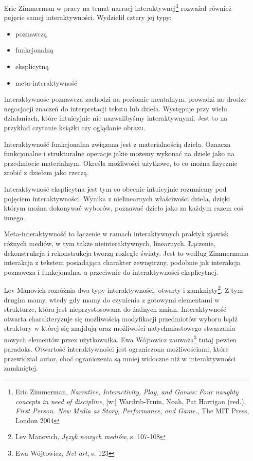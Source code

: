 \documentclass[a4paper,12pt,twoside]{article}
\begin{document}
Eric Zimmerman w pracy na temat narracj interaktywnej\footnote{Eric Zimmerman,
\textit{Narrative, Interactivity, Play, and Games: Four naughty concepts
in need of discipline}, [w:] Wardrib-Fruin, Noah, Pat Harrigan (red.),
\textit{First Person. New Media as Story, Performance, and Game.},
The MIT Press, London 2004} rozważał również
pojęcie samej interaktywności. Wydzielił cztery jej typy:
\begin{itemize}
\item poznawczą
\item funkcjonalną
\item eksplicytną
\item meta-interaktywność
\end{itemize}
Interaktywnośc poznawcza zachodzi na poziomie mentalnym, prowadzi na drodze
negocjacji znaczeń do interpretacji tekstu lub dzieła. Występuje przy
wielu działaniach, które intuicyjnie nie nazwalibyśmy interaktywnymi.
Jest to na przykład czytanie książki czy oglądanie obrazu.

Interaktywność funkcjonalna związana jest z materialnością dzieła.
Oznacza funkcjonalne i strukturalne operacje jakie możemy wykonać
na dziele jako na przedmiocie materialnym. Określa możliwości użytkowe,
to co można fizycznie zrobić z dziełem jako rzeczą.

Interaktywność eksplicytna jest tym co obecnie intuicyjnie rozumiemy
pod pojęciem interaktywności. Wynika z nielinearnych właściwości dzieła,
dzięki którym można dokonywać wyborów, poznawać dzieło jako za każdym
razem coś innego.

Meta-interaktywność to łączenie w ramach interaktywnych praktyk zjawisk
różnych mediów, w tym także nieinteraktywnych, linearnych. Łączenie,
dekonstrukcja i rekonstrukcja tworzą rozległe światy. Jest to według
Zimmermana interakcja z tekstem posiadająca charakter zewnętrzny, podobnie
jak interakcja poznawcza i funkcjonalna, a przeciwnie do interaktywności
eksplicytnej.

Lev Manovich rozróżnia dwa typy interaktywności: otwarty
i zamknięty\footnote{Lev Manovich, \textit{Język nowych mediów}, s. 107-108}.
Z tym drugim mamy, wtedy gdy mamy do czynienia z gotowymi elementami
w strukturze, która jest nieprzystosowana do żadnych zmian. Interaktywność
otwarta charakteryzuje się możliwością modyfikacji przedmiotów wyboru
bądź struktury w której się znajdują oraz możliwości natychmiastowego
stwarzania nowych elementów przez użytkownika. Ewa Wójtowicz
zauważa\footnote{Ewa Wójtowicz, \textit{Net art}, s. 123} tutaj pewien
paradoks. Otwartość interaktywności jest ograniczona możliwościami,
które przewidział autor, choć ograniczenia są mniej widoczne niż
w interaktywności zamkniętej.
\end{document}
